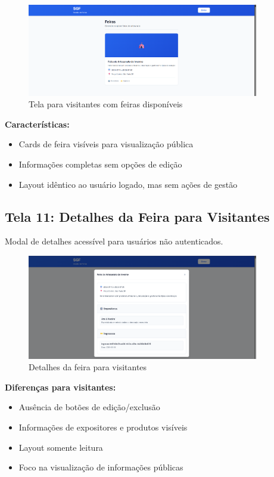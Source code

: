 \documentclass[12pt,a4paper]{article}
\begin{document}
\begin{figure}[H]
\centering
\includegraphics[width=0.9\textwidth]{wireframes/10_tela_visitante_com_feira.png}
\caption{Tela para visitantes com feiras disponíveis}
\label{fig:visitante_feiras}
\end{figure}

\textbf{Características:}
\begin{itemize}
    \item Cards de feira visíveis para visualização pública
    \item Informações completas sem opções de edição
    \item Layout idêntico ao usuário logado, mas sem ações de gestão
\end{itemize}

\subsection{Tela 11: Detalhes da Feira para Visitantes}

Modal de detalhes acessível para usuários não autenticados.

\begin{figure}[H]
\centering
\includegraphics[width=0.9\textwidth]{wireframes/11_visitante_feira_detalhes.png}
\caption{Detalhes da feira para visitantes}
\label{fig:visitante_detalhes}
\end{figure}

\textbf{Diferenças para visitantes:}
\begin{itemize}
    \item Ausência de botões de edição/exclusão
    \item Informações de expositores e produtos visíveis
    \item Layout somente leitura
    \item Foco na visualização de informações públicas
\end{itemize}
\end{document}
